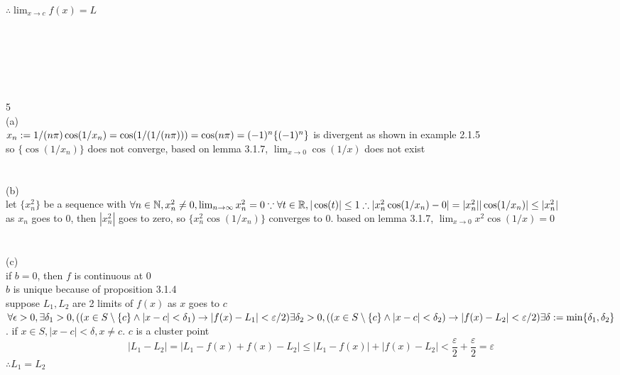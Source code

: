 \documentclass[12pt, border = 4pt, multi]{article} %
\begin{document}
$\therefore \lim_{x \rightarrow c} f(x) = L$\\
\\
\\
\\
\\
\\
\\
5\\
(a)\\
$x_n := 1 / (n\pi)\\
\cos(1 / x_n) = \cos(1 / ( 1 / (n\pi))) = \cos(n\pi) = (-1) ^ n\\
\{(-1) ^ n\}$ is divergent as shown in example 2.1.5\\
so $\{\cos(1 / x_n)\}$ does not converge, based on lemma 3.1.7, $\lim_{x \rightarrow 0} \cos(1 / x)$ does not exist\\
\\
\\
(b)\\
let $\{x_n ^ 2\}$ be a sequence with $\forall n \in \mathbb{N}, x_n ^ 2 \not= 0, \lim_{n \rightarrow \infty} x_n ^ 2 = 0\\
\because \forall t \in \mathbb{R}, |\cos(t)| \leq 1\\
\therefore |x_n ^ 2 \cos(1 / x_n) - 0| = |x_n ^ 2||\cos(1 / x_n)| \leq |x_n ^ 2|$\\
as $x_n$ goes to 0, then $|x_n ^ 2|$ goes to zero, so $\{x_n ^ 2 \cos(1 / x_n)\}$ converges to 0. based on lemma 3.1.7, $\lim_{x \rightarrow 0} x ^ 2 \cos(1 / x) = 0$\\
\\
\\
(c)\\
if $b = 0$, then $f$ is continuous at $0$\\
$b$ is unique because of proposition 3.1.4\\
suppose $L_1, L_2$ are 2 limits of $f(x)$ as $x$ goes to $c$\\
$\forall \epsilon > 0, \exists \delta_1 > 0, ((x \in S \setminus \{c\} \wedge |x - c| < \delta_1) \rightarrow |f(x) - L_1| < \varepsilon / 2)\\
\exists \delta_2 > 0, ((x \in S \setminus \{c\} \wedge |x - c| < \delta_2) \rightarrow |f(x) - L_2| < \varepsilon / 2)\\
\exists \delta := \min\{\delta_1, \delta_2\}$. if $x \in S, |x - c| < \delta, x \not= c$. $c$ is a cluster point
\[|L_1 - L_2| = |L_1 - f(x) + f(x) - L_2| \leq |L_1 - f(x)| + |f(x) - L_2| < \frac{\varepsilon}{2} + \frac{\varepsilon}{2} = \varepsilon\]
$\therefore L_1 = L_2$\\
\end{document}
